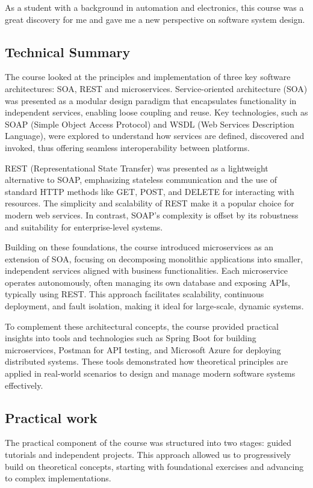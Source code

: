 \noindent As a student with a background in automation and electronics, this course was a great discovery for me and gave me a new perspective on software system design. 

\subsection{Technical Summary} 
\indent \indent The course looked at the principles and implementation of three key software architectures: SOA, REST and microservices.
Service-oriented architecture (SOA) was presented as a modular design paradigm that encapsulates functionality in independent services, enabling loose coupling and reuse.
Key technologies, such as SOAP (Simple Object Access Protocol) and WSDL (Web Services Description Language), were explored to understand how services are defined, discovered and invoked, thus offering seamless interoperability between platforms.
\vspace{0.25cm}

\noindent REST (Representational State Transfer) was presented as a lightweight alternative to SOAP, emphasizing stateless communication and the use of standard HTTP methods like GET, POST, and DELETE for interacting with resources. 
The simplicity and scalability of REST make it a popular choice for modern web services. 
In contrast, SOAP's complexity is offset by its robustness and suitability for enterprise-level systems.
\vspace{0.25cm}

\noindent Building on these foundations, the course introduced microservices as an extension of SOA, focusing on decomposing monolithic applications into smaller, independent services aligned with business functionalities. 
Each microservice operates autonomously, often managing its own database and exposing APIs, typically using REST. This approach facilitates scalability, continuous deployment, and fault isolation, making it ideal for large-scale, dynamic systems.
\vspace{0.25cm}

\noindent To complement these architectural concepts, the course provided practical insights into tools and technologies such as Spring Boot for building microservices, Postman for API testing, and Microsoft Azure for deploying distributed systems. 
These tools demonstrated how theoretical principles are applied in real-world scenarios to design and manage modern software systems effectively.

\subsection{Practical work}
\indent \indent The practical component of the course was structured into two stages: guided tutorials and independent projects. This approach allowed us to progressively build on theoretical concepts, starting with foundational exercises and advancing to complex implementations.

